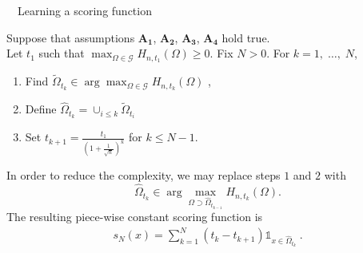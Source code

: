 \begin{algorithm} 
\caption{~~Learning a scoring function}
\label{aistat:algo1} 
Suppose that assumptions $\mathbf{A_1}$, $\mathbf{A_2}$, $\mathbf{A_3}$, $\mathbf{A_4}$ hold true.\\ Let $t_1$ such that $\max_{\Omega \in \mathcal{G}}H_{n,t_1}(\Omega)
\ge  0$.
Fix  $N>0$. %
For $k=1,\; \ldots,\; N$, 
\begin{enumerate} 
\item   Find  $\tilde{\Omega}_{t_k} \in \arg\max_{\Omega \in \mathcal{G}}
H_{n,t_k}(\Omega)$ , %
\item  Define $\hat \Omega_{t_k}= \cup_{i \le k} \tilde \Omega_{t_i}$
\item  Set  $ t_{k+1} =\frac{t_1}{(1+\frac{1}{\sqrt n})^{k}}   $ for $k\le N-1$. %
\end{enumerate} 

In order to reduce the complexity, we may replace steps $1$ and $2$
with $$\hat {\Omega}_{t_k} \in \arg\max_{\Omega \supset \hat \Omega_{t_{k-1}}} H_{n,t_k}(\Omega).$$
\noindent
The resulting piece-wise constant scoring function is
\begin{align}
\label{aistat:definition_sN}
s_N(x)= \sum_{k=1}^{N}(t_{k}-t_{k+1}) \mathds{1}_{x \in \hat{\Omega}_{t_k}}~.
\end{align}
\end{algorithm}




